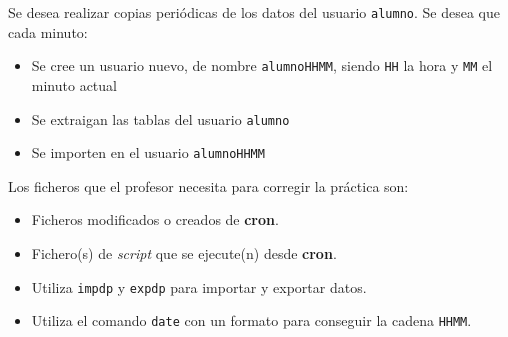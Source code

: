 \begin{homeworkProblem}

  Se desea realizar copias periódicas de los datos del usuario \texttt{alumno}. Se desea que cada minuto:
  \begin{itemize}
  \item Se cree un usuario nuevo, de nombre \texttt{alumnoHHMM}, siendo \texttt{HH} la hora y \texttt{MM} el minuto actual
  \item Se extraigan las tablas del usuario \texttt{alumno} 
  \item Se importen en el usuario \texttt{alumnoHHMM}
  \end{itemize}

  Los ficheros que el profesor necesita para corregir la práctica son:
  \begin{itemize}
  \item Ficheros modificados o creados de \textbf{cron}.
  \item Fichero(s) de \textit{script} que se ejecute(n) desde \textbf{cron}.
  \end{itemize}

  \begin{Aviso}[Ayuda]
    \begin{itemize}
    \item Utiliza \texttt{impdp} y \texttt{expdp} para importar y exportar datos.
    \item Utiliza el comando \texttt{date} con un formato para conseguir la cadena \texttt{HHMM}.
    \end{itemize}
  \end{Aviso}


\end{homeworkProblem}

